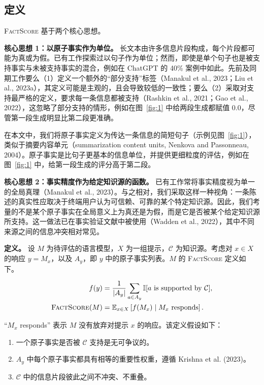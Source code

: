 \documentclass[11pt,UTF8,fontset=fandol]{ctexart}
\providecommand{\indi}{\mathbb{I}}
\newcommand{\FS}{\textsc{FactScore}}
\begin{document}
\subsection{定义}

\FS{} 基于两个核心思想。

\textbf{核心思想 1：以原子事实作为单位。} 长文本由许多信息片段构成，每个片段都可能为真或为假。已有工作探索过以句子作为单位；然而，即使是单个句子也是被支持事实与未被支持事实的混合，例如在 ChatGPT 的 40\% 案例中如此。先前及同期工作要么（1）定义一个额外的“部分支持”标签（Manakul et al., 2023；Liu et al., 2023a），其定义可能是主观的，且会导致较低的一致性；要么（2）采取对支持最严格的定义，要求每一条信息都被支持（Rashkin et al., 2021；Gao et al., 2022），这忽略了部分支持的情形，例如在图~\ref{fig:1} 中给两段生成都赋值 0.0，尽管第一段生成明显比第二段更准确。

在本文中，我们将原子事实定义为传达一条信息的简短句子（示例见图~\ref{fig:1}），类似于摘要内容单元（summarization content units, Nenkova and Passonneau, 2004）。原子事实是比句子更基本的信息单位，并提供更细粒度的评估，例如在图~\ref{fig:1} 中，给第一段生成的评分高于第二段。

\textbf{核心思想 2：事实精度作为给定知识源的函数。} 已有工作常将事实精度视为单一的全局真理（Manakul et al., 2023）。与之相对，我们采取这样一种视角：一条陈述的真实性应取决于终端用户认为可信赖、可靠的某个特定知识源。因此，我们考量的不是某个原子事实在全局意义上为真还是为假，而是它是否被某个给定知识源所支持。这一做法已在事实验证文献中被使用（Wadden et al., 2022），其中不同来源之间的信息冲突相对常见。

\textbf{定义。} 设 $M$ 为待评估的语言模型，$X$ 为一组提示，$\mathcal{C}$ 为知识源。考虑对 $x \in X$ 的响应 $y = M_x$，以及 $A_y$，即 $y$ 中的原子事实列表。$M$ 的 \FS{} 定义如下。

\begin{align*}
f(y) &= \frac{1}{|A_y|} \sum_{a \in A_y} \indi[a \text{ is supported by } \mathcal{C}], \\
\text{\textsc{FactScore}}(M) &= \mathbb{E}_{x \in X}\left[f(M_x) \mid M_x \text{ responds}\right].
\end{align*}

“$M_x$ responds” 表示 $M$ 没有放弃对提示 $x$ 的响应。该定义假设如下：

\begin{enumerate}[leftmargin=2em]
\item 一个原子事实是否被 $\mathcal{C}$ 支持是无可争议的。
\item $A_y$ 中每个原子事实都具有相等的重要性权重，遵循 Krishna et al. (2023)。
\item $\mathcal{C}$ 中的信息片段彼此之间不冲突、不重叠。
\end{enumerate}
\end{document}
